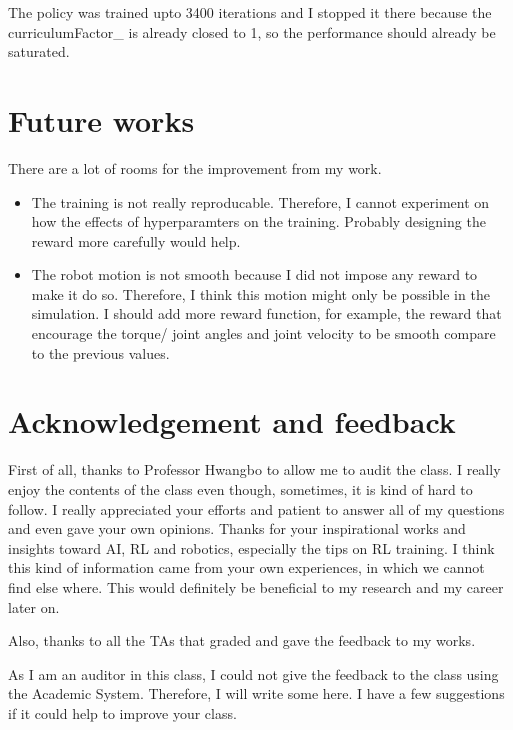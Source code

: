 \documentclass{article}
\begin{document}
    The policy was trained upto 3400 iterations and I stopped it there because the curriculumFactor\_ is already closed to 1, so the performance should already be saturated.
    
\section{Future works}
There are a lot of rooms for the improvement from my work.
\begin{itemize}
    \item The training is not really reproducable. Therefore, I cannot experiment on how the effects of hyperparamters on the training. Probably designing the reward more carefully would help.
    \item The robot motion is not smooth because I did not impose any reward to make it do so. 
            Therefore, I think this motion might only be possible in the simulation. I should add more reward function, 
            for example, the reward that encourage the torque/ joint angles and joint velocity to be smooth compare to the previous values.
\end{itemize}

\section{Acknowledgement and feedback}
    First of all, thanks to Professor Hwangbo to allow me to audit the class. 
I really enjoy the contents of the class even though, sometimes, it is kind of hard to follow.
I really appreciated your efforts and patient to answer all of my questions and even gave your own opinions.
Thanks for your inspirational works and insights toward AI, RL and robotics, especially the tips on RL training. 
I think this kind of information came from your own experiences, in which we cannot find else where.
This would definitely be beneficial to my research and my career later on.

    Also, thanks to all the TAs that graded and gave the feedback to my works.

    As I am an auditor in this class, I could not give the feedback to the class using the Academic System. Therefore, I will write some here. I have a few suggestions if it could help to improve your class.
\end{document}
